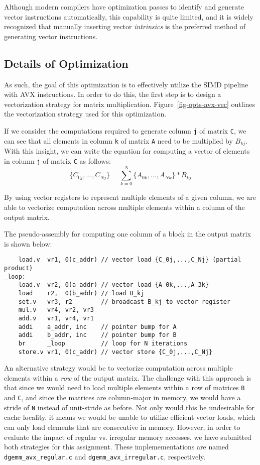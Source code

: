 Although modern compilers have optimization passes to identify and
generate vector instructions automatically, this capability is quite
limited, and it is widely recognized that manually inserting vector
\emph{intrinsics} is the preferred method of generating vector
instructions.
\medskip

\subsection{Details of Optimization}


As such, the goal of this optimization is to effectively utilize the SIMD
pipeline with AVX instructions. In order to do this, the first step is to
design a vectorization strategy for matrix
multiplication. Figure~\ref{fig-opts-avx-vec} outlines the
vectorization strategy used for this optimization.
\smallskip

If we consider the computations required to generate column {\tt{j}} of
matrix {\tt{C}}, we can see that all elements in column {\tt{k}} of matrix
{\tt{A}} need to be multiplied by $B_{kj}$. With this insight, we can
write the equation for computing a vector of elements in column {\tt{j}} of
matrix {\tt{C}} as follows:
\[
\{C_{0j},...,C_{Nj}\} = \sum_{k=0}^{N}\{A_{0k},...,A_{Nk}\}*B_{kj}
\]
\smallskip

By using vector registers to represent multiple elements of a given
column, we are able to vectorize computation across multiple elements
within a column of the output matrix.
\smallskip

The pseudo-assembly for computing one column of a block in the output
matrix is shown below:
\smallskip

\begin{verbatim}
    load.v  vr1, 0(c_addr) // vector load {C_0j,...,C_Nj} (partial product)
_loop:
    load.v  vr2, 0(a_addr) // vector load {A_0k,...,A_3k}
    load    r2,  0(b_addr) // load B_kj
    set.v   vr3, r2        // broadcast B_kj to vector register
    mul.v   vr4, vr2, vr3
    add.v   vr1, vr4, vr1
    addi    a_addr, inc    // pointer bump for A
    addi    b_addr, inc    // pointer bump for B
    br      _loop          // loop for N iterations
    store.v vr1, 0(c_addr) // vector store {C_0j,...,C_Nj}
\end{verbatim}
\smallskip

An alternative strategy would be to vectorize computation across
multiple elements within a \emph{row} of the output matrix. The challenge
with this approach is that since we would need to load multiple elements
within a row of matrices {\tt{B}} and {\tt{C}}, and since the matrices
are column-major in memory, we would have a stride of {\tt{N}} instead of
unit-stride as before. Not only would this be undesirable for cache
locality, it means we would be unable to utilize efficient vector loads,
which can only load elements that are consecutive in memory. However, in
order to evaluate the impact of regular vs. irregular memory accesses, we
have submitted both strategies for this assignment. These
implemementations are named {\tt{dgemm\_avx\_regular.c}} and
{\tt{dgemm\_avx\_irregular.c}}, respectively.
\smallskip

